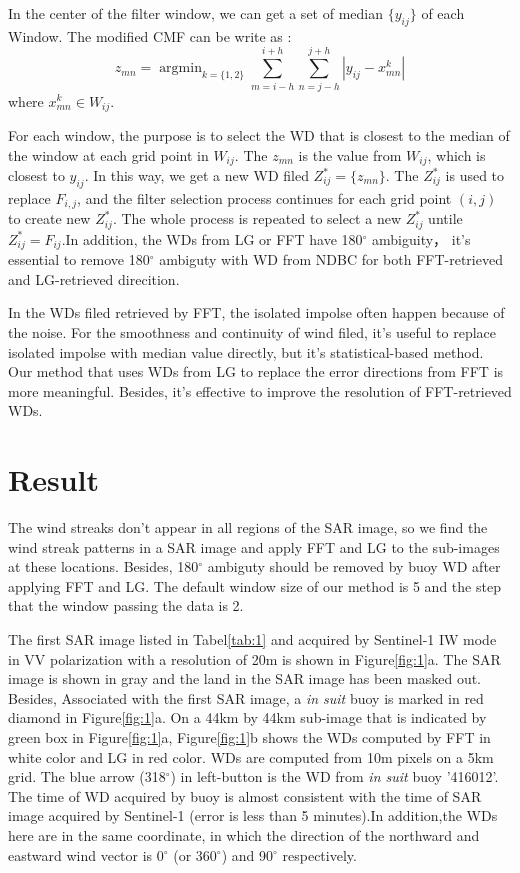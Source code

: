 \documentclass{article}
\begin{document}
In the center of the filter window, we can get a set of median $\{y_{ij}\}$ of each Window. The modified CMF can be write as :
\begin{equation}
z_{mn}= \mathop{\arg\min}_{k=\{1, 2\}}\sum_{m = i-h}^{i+h}\sum_{n=j-h}^{j+h}|y_{ij} - x_{mn}^k|
\end{equation}
where $x_{mn}^k \in W_{ij}$.

For each window, the purpose is to select the WD that is closest to the median of the window at each grid point in $W_{ij}$. The $z_{mn}$ is the value from $W_{ij}$, which is closest to $y_{ij}$. In this way, we get a new WD filed $Z_{ij}^{*}=\{z_{mn}\}$. The $Z_{ij}^{*}$ is used to replace $F_{i,j}$, and the filter selection process continues for each grid point $(i,j)$ to create new $Z_{ij}^{*}$. The whole process is repeated to select a new $Z_{ij}^{*}$ untile $Z_{ij}^{*}=F_{ij}$.In addition, the WDs from LG or FFT have 180$^\circ$ ambiguity， it's essential to remove 180$^\circ$ ambiguty with WD from NDBC for both FFT-retrieved and LG-retrieved direcition.

In the WDs filed retrieved by FFT, the isolated impolse often happen because of the noise. For the smoothness and continuity of wind filed, it's useful to replace isolated impolse with median value directly, but it's statistical-based method. Our method that uses WDs from LG to replace the error directions from FFT is more meaningful. Besides, it's effective to improve the resolution of FFT-retrieved WDs.

\section{Result}
\label{sec:result}
The wind streaks don't appear in all regions of the SAR image, so we find the wind streak patterns in a SAR image and apply FFT and LG to the sub-images at these locations. Besides, 180$^\circ$ ambiguty should be removed by buoy WD after applying FFT and LG. The default window size of our method is 5 and the step that the window passing the data is 2.

The first SAR image listed in Tabel\ref{tab:1} and acquired by Sentinel-1 IW mode in VV polarization with a resolution of 20m is shown in Figure\ref{fig:1}a. The SAR image is shown in gray and the land in the SAR image has been masked out. Besides, Associated with the first SAR image, a {\it in suit} buoy is marked in red diamond in Figure\ref{fig:1}a. On a 44km by 44km sub-image that is indicated by green box in Figure\ref{fig:1}a, Figure\ref{fig:1}b shows the WDs computed by FFT in white color and LG in red color. WDs are computed from 10m pixels on a 5km grid. The blue arrow (318$^\circ$) in left-button is the WD from {\it in suit} buoy '416012'. The time of WD acquired by buoy is almost consistent with the time of SAR image acquired by Sentinel-1 (error is less than 5 minutes).In addition,the WDs here are in the same coordinate, in which the direction of the northward and eastward wind vector is 0$^\circ$ (or 360$^\circ$) and 90$^\circ$ respectively.
\end{document}
